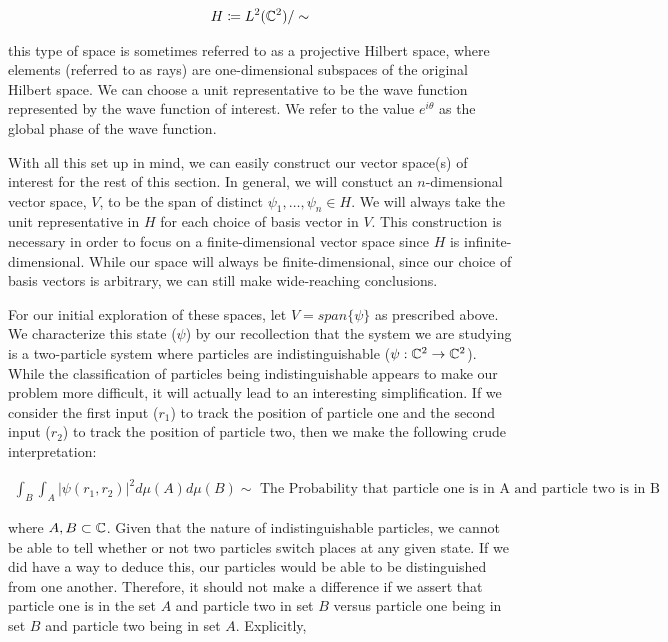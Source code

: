\begin{equation}
	\begin{aligned}
		H \coloneq L^2(\mathbb{C}^2)/\sim
	\end{aligned}
\end{equation}

this type of space is sometimes referred to as a projective Hilbert space, where elements (referred to as rays) are one-dimensional subspaces of the original Hilbert space. We can choose a unit representative to be the wave function represented by the wave function of interest. We refer to the value $e^{i\theta}$ as the global phase of the wave function.

With all this set up in mind, we can easily construct our vector space(s) of interest for the rest of this section. In general, we will constuct an $n$-dimensional vector space, $V$, to be the span of distinct $\psi_1,\hdots,\psi_n\in H$. We will always take the unit representative in $H$ for each choice of basis vector in $V$. This construction is necessary in order to focus on a finite-dimensional vector space since $H$ is infinite-dimensional. While our space will always be finite-dimensional, since our choice of basis vectors is arbitrary, we can still make wide-reaching conclusions. 

For our initial exploration of these spaces, let $V = span\{\psi\}$ as prescribed above. We characterize this state ($\psi$) by our recollection that the system we are studying is a two-particle system where particles are indistinguishable ($\psi:\mathbb{C}^2\rightarrow\mathbb{C}^2$). While the classification of particles being indistinguishable appears to make our problem more difficult, it will actually lead to an interesting simplification. If we consider the first input ($r_1$) to track the position of particle one and the second input ($r_2$) to track the position of particle two, then we make the following crude interpretation:

\begin{small}
\begin{equation}
	\begin{aligned}
		\int_B \int_A |\psi(r_1,r_2)|^2 d\mu(A)d\mu(B) \sim \text{ The Probability that particle one is in A and particle two is in B}
	\end{aligned}
\end{equation}
\end{small}

where $A,B\subset\mathbb{C}$. Given that the nature of indistinguishable particles, we cannot be able to tell whether or not two particles switch places at any given state. If we did have a way to deduce this, our particles would be able to be distinguished from one another. Therefore, it should not make a difference if we assert that particle one is in the set $A$ and particle two in set $B$ versus particle one being in set $B$ and particle two being in set $A$. Explicitly,


